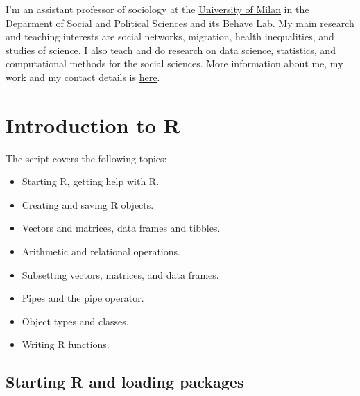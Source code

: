 \documentclass[
]{book}
\providecommand{\tightlist}{%
  \setlength{\itemsep}{0pt}\setlength{\parskip}{0pt}}
\begin{document}
I'm an assistant professor of sociology at the \href{https://www.unimi.it/en}{University of Milan} in the \href{http://eng.sps.unimi.it/ecm/home}{Deparment of Social and Political Sciences} and its \href{https://behavelab.org/}{Behave Lab}. My main research and teaching interests are social networks, migration, health inequalities, and studies of science. I also teach and do research on data science, statistics, and computational methods for the social sciences. More information about me, my work and my contact details is \href{http://www.raffaelevacca.com/}{here}.

\hypertarget{intro}{%
\chapter{Introduction to R}\label{intro}}

The script covers the following topics:

\begin{itemize}
\tightlist
\item
  Starting R, getting help with R.
\item
  Creating and saving R objects.
\item
  Vectors and matrices, data frames and tibbles.
\item
  Arithmetic and relational operations.
\item
  Subsetting vectors, matrices, and data frames.
\item
  Pipes and the pipe operator.
\item
  Object types and classes.
\item
  Writing R functions.
\end{itemize}

\hypertarget{starting-R-and-loading-packages}{%
\section{Starting R and loading packages}\label{starting-R-and-loading-packages}}
\end{document}
